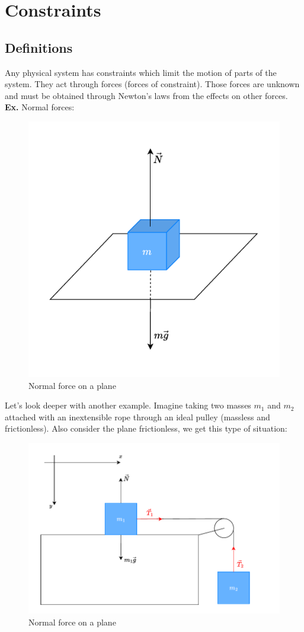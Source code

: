 \chapter{Constraints}
\section{Definitions}
Any physical system has constraints which limit the motion of parts of the system. They act through forces (forces of constraint). Those forces are unknown and must be obtained through Newton's laws from the effects on other forces.\\
\textbf{Ex.} Normal forces:
\begin{figure}[H]
    \centering
    \includegraphics[width=0.5\linewidth]{res/svg/normalforce.drawio}
    \caption{Normal force on a plane}
    \label{fig:image6}
\end{figure}
Let's look deeper with another example. Imagine taking two masses $m_1$ and $m_2$ attached with an inextensible rope through an ideal pulley (massless and frictionless). Also consider the plane frictionless, we get this type of situation:
\begin{figure}[H]
    \centering
    \includegraphics[width=0.6\linewidth]{res/svg/idealpulley.drawio}
    \caption{Normal force on a plane}
    \label{fig:image7}
\end{figure}
